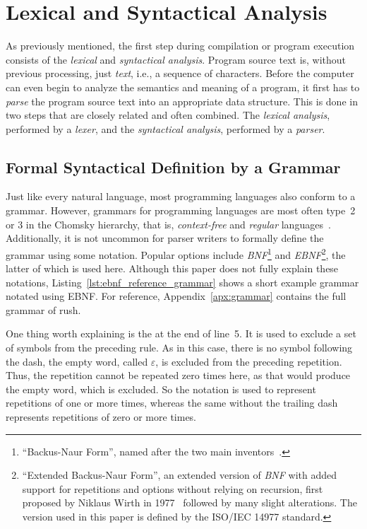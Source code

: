 \section{Lexical and Syntactical Analysis}

As previously mentioned, the first step during compilation or program execution consists of the \emph{lexical} and \emph{syntactical analysis}.
Program source text is, without previous processing, just \emph{text}, i.e., a sequence of characters.
Before the computer can even begin to analyze the semantics and meaning of a program, it first has to \emph{parse} the program source text into an appropriate data structure.
This is done in two steps that are closely related and often combined.
The \emph{lexical analysis}, performed by a \emph{lexer}, and the \emph{syntactical analysis}, performed by a \emph{parser}.

\subsection{Formal Syntactical Definition by a Grammar}

Just like every natural language, most programming languages also conform to a grammar.
However, grammars for programming languages are most often type~2 or 3 in the Chomsky hierarchy, that is, \emph{context-free} and \emph{regular} languages~\cite[pp.~23f]{Watson2017}.
Additionally, it is not uncommon for parser writers to formally define the grammar using some notation.
Popular options include \emph{BNF}\footnote{\enquote{Backus-Naur Form}, named after the two main inventors~\cite{Backus1960}.} and \emph{EBNF}\footnote{\enquote{Extended Backus-Naur Form}, an extended version of \emph{BNF} with added support for repetitions and options without relying on recursion, first proposed by Niklaus Wirth in 1977~\cite{Wirth1977} followed by many slight alterations. The version used in this paper is defined by the ISO/IEC 14977 standard.}, the latter of which is used here.
Although this paper does not fully explain these notations, Listing~\ref{lst:ebnf_reference_grammar} shows a short example grammar notated using EBNF\@.
For reference, Appendix~\ref{apx:grammar} contains the full grammar of rush.


One thing worth explaining is the \qVerb{-} at the end of line~5.
It is used to exclude a set of symbols from the preceding rule.
As in this case, there is no symbol following the dash, the empty word, called $\varepsilon$, is excluded from the preceding repetition.
Thus, the repetition cannot be repeated zero times here, as that would produce the empty word, which is excluded.
So the notation \qVerbCmd{\{ \dots{} \}-} is used to represent repetitions of one or more times, whereas the same without the trailing dash represents repetitions of zero or more times.

